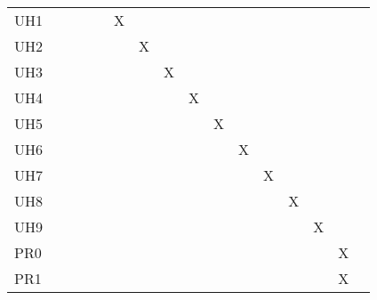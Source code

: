 \documentclass[12pt, titlepage]{article}
\begin{document}
\begin{longtable}{lcccclllllclcccc}
\multicolumn{1}{l|}{UH1} &  &  &  &  & \multicolumn{1}{c}{X} &  &  &  &  & \multicolumn{1}{l}{} &  & \multicolumn{1}{l}{} & \multicolumn{1}{l}{} & \multicolumn{1}{l}{} & \multicolumn{1}{l}{} \\
\multicolumn{1}{l|}{UH2} &  &  &  &  & \multicolumn{1}{c}{} & \multicolumn{1}{c}{X} &  &  &  & \multicolumn{1}{l}{} &  & \multicolumn{1}{l}{} & \multicolumn{1}{l}{} & \multicolumn{1}{l}{} & \multicolumn{1}{l}{} \\
\multicolumn{1}{l|}{UH3} &  &  &  &  & \multicolumn{1}{c}{} &  & \multicolumn{1}{c}{X} &  &  & \multicolumn{1}{l}{} &  & \multicolumn{1}{l}{} & \multicolumn{1}{l}{} & \multicolumn{1}{l}{} & \multicolumn{1}{l}{} \\
\multicolumn{1}{l|}{UH4} &  &  &  &  & \multicolumn{1}{c}{} &  &  & \multicolumn{1}{c}{X} &  & \multicolumn{1}{l}{} &  & \multicolumn{1}{l}{} & \multicolumn{1}{l}{} & \multicolumn{1}{l}{} & \multicolumn{1}{l}{} \\
\multicolumn{1}{l|}{UH5} & \multicolumn{1}{l}{} & \multicolumn{1}{l}{} & \multicolumn{1}{l}{} & \multicolumn{1}{l}{} &  &  &  &  & \multicolumn{1}{c}{X} &  & \multicolumn{1}{c}{} &  &  &  &  \\
\multicolumn{1}{l|}{UH6} & \multicolumn{1}{l}{} & \multicolumn{1}{l}{} & \multicolumn{1}{l}{} & \multicolumn{1}{l}{} &  &  &  &  & \multicolumn{1}{c}{} & X & \multicolumn{1}{c}{} &  &  &  &  \\
\multicolumn{1}{l|}{UH7} & \multicolumn{1}{l}{} & \multicolumn{1}{l}{} & \multicolumn{1}{l}{} & \multicolumn{1}{l}{} &  &  &  &  & \multicolumn{1}{c}{} &  & \multicolumn{1}{c}{X} &  &  &  &  \\
\multicolumn{1}{l|}{UH8} & \multicolumn{1}{l}{} & \multicolumn{1}{l}{} & \multicolumn{1}{l}{} & \multicolumn{1}{l}{} &  &  &  &  & \multicolumn{1}{c}{} &  & \multicolumn{1}{c}{} & X &  &  &  \\
\multicolumn{1}{l|}{UH9} & \multicolumn{1}{l}{} & \multicolumn{1}{l}{} & \multicolumn{1}{l}{} & \multicolumn{1}{l}{} &  &  &  &  & \multicolumn{1}{c}{} &  & \multicolumn{1}{c}{} &  & X &  &  \\
\multicolumn{1}{l|}{PR0} & \multicolumn{1}{l}{} & \multicolumn{1}{l}{} & \multicolumn{1}{l}{} & \multicolumn{1}{l}{} &  &  &  &  & \multicolumn{1}{c}{} &  & \multicolumn{1}{c}{} &  &  & X &  \\
\multicolumn{1}{l|}{PR1} & \multicolumn{1}{l}{} & \multicolumn{1}{l}{} & \multicolumn{1}{l}{} & \multicolumn{1}{l}{} &  &  &  &  & \multicolumn{1}{c}{} &  & \multicolumn{1}{c}{} &  &  & X &  \\

\end{longtable}
\end{document}
